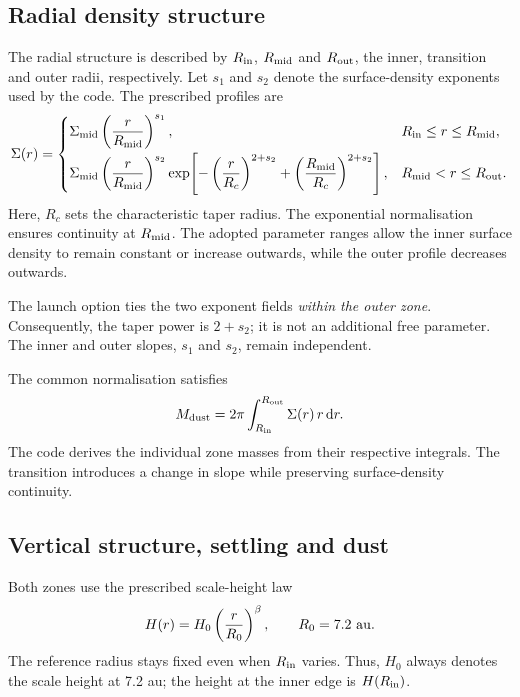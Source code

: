 \documentclass[11pt,a4paper]{article}
\newcommand{\code}[1]{\texttt{\detokenize{#1}}}
\begin{document}
\subsection{Radial density structure}

The radial structure is described by $R_{\rm in}$, $R_{\rm mid}$ and
$R_{\rm out}$, the inner, transition and outer radii, respectively. Let
$s_1$ and $s_2$ denote the surface-density exponents used by the code.
The prescribed profiles are
\begin{equation}
\Sigma(r)=
\begin{cases}
\displaystyle
\Sigma_{\rm mid}
\left(\frac{r}{R_{\rm mid}}\right)^{s_1},
& R_{\rm in}\leq r\leq R_{\rm mid},\\[8pt]
\displaystyle
\Sigma_{\rm mid}
\left(\frac{r}{R_{\rm mid}}\right)^{s_2}
\exp\!\left[
-\left(\frac{r}{R_c}\right)^{2+s_2}
+\left(\frac{R_{\rm mid}}{R_c}\right)^{2+s_2}
\right],
& R_{\rm mid}<r\leq R_{\rm out}.
\end{cases}
\label{eq:sigma}
\end{equation}
Here, $R_c$ sets the characteristic taper radius. The exponential
normalisation ensures continuity at $R_{\rm mid}$. The adopted parameter
ranges allow the inner surface density to remain constant or increase
outwards, while the outer profile decreases outwards.

The launch option \code{--tapered-edge-p1-eq-p2} ties the two exponent fields
\emph{within the outer zone}. Consequently, the taper power is $2+s_2$;
it is not an additional free parameter. The inner and outer slopes,
$s_1$ and $s_2$, remain independent.

The common normalisation satisfies
\begin{equation}
M_{\rm dust}
=2\pi\int_{R_{\rm in}}^{R_{\rm out}}\Sigma(r)\,r\,{\rm d}r.
\end{equation}
The code derives the individual zone masses from their respective
integrals. The transition introduces a change in slope while preserving
surface-density continuity.

\subsection{Vertical structure, settling and dust}

Both zones use the prescribed scale-height law
\begin{equation}
H(r)=H_0\left(\frac{r}{R_0}\right)^\beta,
\qquad R_0=7.2\ {\rm au}.
\end{equation}
The reference radius stays fixed even when $R_{\rm in}$ varies. Thus,
$H_0$ always denotes the scale height at 7.2 au; the height at the inner
edge is $H(R_{\rm in})$.
\end{document}
